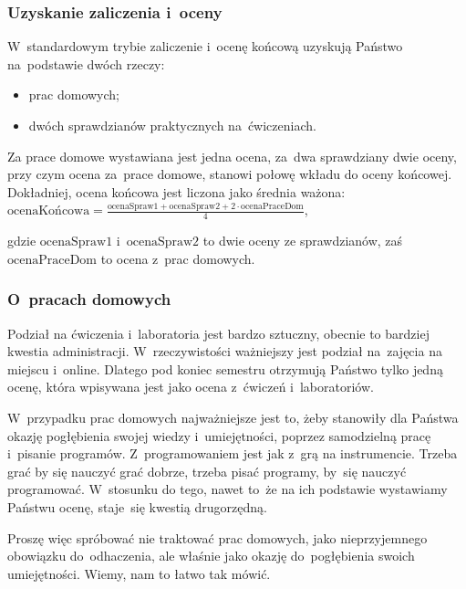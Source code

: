 \documentclass[10pt,t]{beamer}
\begin{document}
\begin{frame}
  \frametitle{Uzyskanie zaliczenia i~oceny}


  W~standardowym trybie zaliczenie i~ocenę końcową uzyskują Państwo
  na~podstawie dwóch rzeczy:

  \vspace{-0.3em}



  \begin{itemize}

  \item prac domowych;

  \item dwóch sprawdzianów praktycznych na~ćwiczeniach.

  \end{itemize}

  \vspace{-0.3em}


  Za prace domowe wystawiana jest jedna ocena, za~dwa sprawdziany
  dwie oceny, przy czym ocena za~prace domowe, stanowi
  \alert{połowę} wkładu do oceny końcowej. Dokładniej, ocena końcowa
  jest liczona jako średnia ważona: \\[0.3em]
  $\displaystyle
  \text{ocenaKońcowa} =
  \frac{ \text{ocenaSpraw1} + \text{ocenaSpraw2} +
    2 \cdot \text{ocenaPraceDom} }{ 4 }$,

  \vspace{0.5em}


  gdzie $\text{ocenaSpraw1}$ i~$\text{ocenaSpraw2}$ to dwie oceny ze
  sprawdzianów, zaś $\text{ocenaPraceDom}$ to ocena z~prac domowych.

\end{frame}





\begin{frame}
  \frametitle{O~pracach domowych}


  Podział na ćwiczenia i~laboratoria jest bardzo sztuczny, obecnie
  to bardziej kwestia administracji. W~rzeczywistości ważniejszy jest
  podział na~zajęcia na miejscu i~online. Dlatego pod koniec semestru
  otrzymują Państwo tylko \alert{jedną} ocenę, która wpisywana jest jako
  ocena z~ćwiczeń i~laboratoriów.

  W~przypadku prac domowych najważniejsze jest to, żeby stanowiły dla
  Państwa okazję pogłębienia swojej wiedzy i~umiejętności, poprzez
  samodzielną pracę i~pisanie programów. Z~programowaniem jest jak z~grą
  na instrumencie. Trzeba grać by się nauczyć grać dobrze, trzeba pisać
  programy, by~się nauczyć programować. W~stosunku do tego, nawet to~że
  na ich podstawie wystawiamy Państwu ocenę, staje~się kwestią drugorzędną.

  Proszę więc spróbować nie traktować prac domowych, jako nieprzyjemnego
  obowiązku do~odhaczenia, ale właśnie jako okazję do~pogłębienia swoich
  umiejętności. Wiemy, nam to łatwo tak mówić.

\end{frame}
\end{document}
